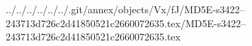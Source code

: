 ../../../../../../.git/annex/objects/Vx/fJ/MD5E-s3422--243713d726c2d41850521c2660072635.tex/MD5E-s3422--243713d726c2d41850521c2660072635.tex